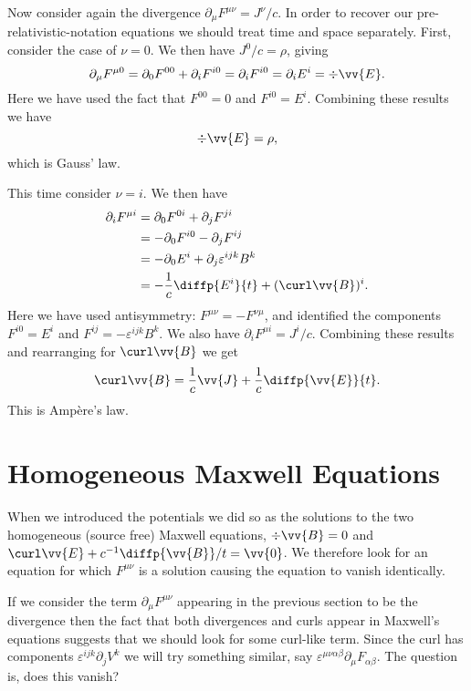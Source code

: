 Now consider again the divergence \(\partial_\mu F^{\mu\nu} = J^\nu/c\).
In order to recover our pre-relativistic-notation equations we should treat time and space separately.
First, consider the case of \(\nu = 0\).
We then have \(J^0/c = \rho\), giving
\begin{equation}
    \partial_\mu F^{\mu0} = \partial_0F^{00} + \partial_iF^{i0} = \partial_iF^{i0} = \partial_iE^i = \div\vv{E}.
\end{equation}
Here we have used the fact that \(F^{00} = 0\) and \(F^{i0} = E^i\).
Combining these results we have
\begin{equation}
    \div\vv{E} = \rho,
\end{equation}
which is Gauss' law.

This time consider \(\nu = i\).
We then have
\begin{align}
    \partial_iF^{\mu i} &= \partial_0 F^{0i} + \partial_jF^{ji}\\
    &= -\partial_0 F^{i0} - \partial_jF^{ij}\\
    &= -\partial_0 E^i + \partial_j\varepsilon^{ijk}B^k\\
    &= -\frac{1}{c}\diffp{E^i}{t} + (\curl\vv{B})^i.
\end{align}
Here we have used antisymmetry: \(F^{\mu\nu} = -F^{\nu\mu}\), and identified the components \(F^{i0} = E^i\) and \(F^{ij} = -\varepsilon^{ijk}B^k\).
We also have \(\partial_iF^{\mu i} = J^i/c\).
Combining these results and rearranging for \(\curl\vv{B}\) we get
\begin{equation}
    \curl\vv{B} = \frac{1}{c}\vv{J} + \frac{1}{c}\diffp{\vv{E}}{t}.
\end{equation}
This is Amp\`ere's law.

\section{Homogeneous Maxwell Equations}
When we introduced the potentials we did so as the solutions to the two homogeneous (source free) Maxwell equations, \(\div\vv{B} = 0\) and \(\curl\vv{E} + c^{-1}\diffp{\vv{B}}/{t} = \vv{0}\).
We therefore look for an equation for which \(F^{\mu\nu}\) is a solution causing the equation to vanish identically.

If we consider the term \(\partial_\mu F^{\mu\nu}\) appearing in the previous section to be the divergence then the fact that both divergences and curls appear in Maxwell's equations suggests that we should look for some curl-like term.
Since the curl has components \(\varepsilon^{ijk}\partial_j V^k\) we will try something similar, say \(\varepsilon^{\mu\nu\alpha\beta}\partial_\mu F_{\alpha\beta}\).
The question is, does this vanish?

